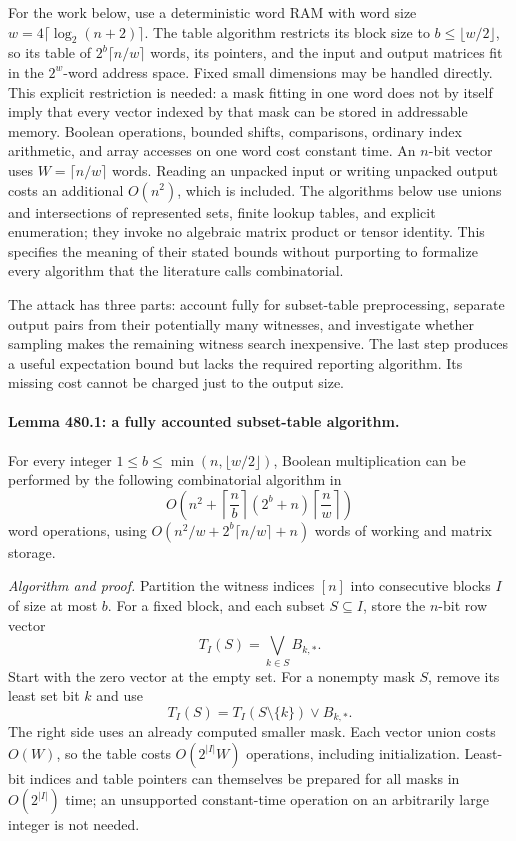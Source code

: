 \documentclass[11pt]{article}
\begin{document}
For the work below, use a deterministic word RAM with word size
$w=4\lceil\log_2(n+2)\rceil$. The table algorithm restricts its block
size to $b\leq\lfloor w/2\rfloor$, so its table of
$2^b\lceil n/w\rceil$ words, its pointers, and the input and output
matrices fit in the $2^w$-word address space. Fixed small dimensions may
be handled directly. This explicit restriction is needed: a mask fitting
in one word does not by itself imply that every vector indexed by that
mask can be stored in addressable memory.
Boolean operations, bounded shifts, comparisons, ordinary index arithmetic,
and array accesses on one word cost constant time. An $n$-bit vector uses
$W=\lceil n/w\rceil$ words. Reading an unpacked input or writing unpacked
output costs an additional $O(n^2)$, which is included. The algorithms
below use unions and intersections of represented sets, finite lookup
tables, and explicit enumeration; they invoke no algebraic matrix product
or tensor identity. This specifies the meaning of their stated bounds
without purporting to formalize every algorithm that the literature calls
combinatorial.

The attack has three parts: account fully for subset-table preprocessing,
separate output pairs from their potentially many witnesses, and investigate
whether sampling makes the remaining witness search inexpensive. The last
step produces a useful expectation bound but lacks the required reporting
algorithm. Its missing cost cannot be charged just to the output size.

\paragraph{Lemma 480.1: a fully accounted subset-table algorithm.}
For every integer $1\leq b\leq\min(n,\lfloor w/2\rfloor)$, Boolean multiplication can
be performed by the following combinatorial algorithm in
\begin{equation}\label{a480:tablecost}
 O\left(n^2+\left\lceil\frac nb\right\rceil
                         (2^b+n)\left\lceil\frac nw\right\rceil\right)
\end{equation}
word operations, using
$O(n^2/w+2^b\lceil n/w\rceil+n)$ words of working and matrix storage.

\emph{Algorithm and proof.} Partition the witness indices $[n]$ into
consecutive blocks $I$ of size at most $b$. For a fixed block, and each
subset $S\subseteq I$, store the $n$-bit row vector
\[
                     T_I(S)=\bigvee_{k\in S}B_{k,*}.
\]
Start with the zero vector at the empty set. For a nonempty mask $S$,
remove its least set bit $k$ and use
\begin{equation}\label{a480:recurrence}
                     T_I(S)=T_I(S\setminus\{k\})\vee B_{k,*}.
\end{equation}
The right side uses an already computed smaller mask. Each vector union
costs $O(W)$, so the table costs $O(2^{|I|}W)$ operations, including
initialization. Least-bit indices and table pointers can themselves be
prepared for all masks in $O(2^{|I|})$ time; an unsupported constant-time
operation on an arbitrarily large integer is not needed.
\end{document}
